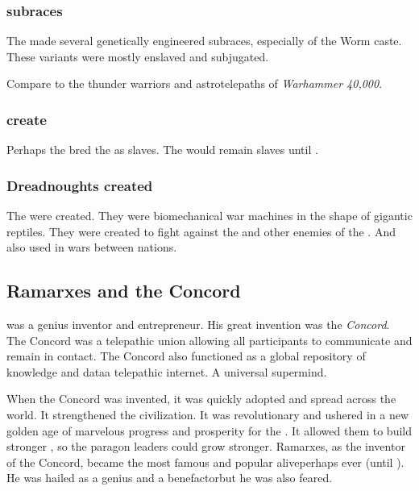 \subsubsection{\Ophidian subraces}
The \caisith made several genetically engineered subraces, especially of the Worm caste.
These \caisith variants were mostly enslaved and subjugated. 

Compare to the thunder warriors and astrotelepaths of \emph{Warhammer 40,000}. 





\subsubsection{\Ophidians create \nephilim}
Perhaps the \ophidians bred the \nephilim as slaves.
The \nephilim would remain slaves until . 





\subsubsection{Dreadnoughts created}
The  were created. 
They were biomechanical war machines in the shape of gigantic reptiles. 
They were created to fight against the \vorcanths and other enemies of the \ophidians.
And also used in wars between \ophidian nations. 















\subsection{Ramarxes and the Concord}
 was a genius \caisith inventor and entrepreneur. 
His great invention was the \emph{Concord}. 
The Concord was a telepathic union allowing all participants to communicate and remain in contact.
The Concord also functioned as a global repository of knowledge and data\dash a telepathic internet. 
A universal \caisith supermind. 

When the Concord was invented, it was quickly adopted and spread across the world. 
It strengthened the \caisith civilization.
It was revolutionary and ushered in a new golden age of marvelous progress and prosperity for the \caisith. 
It allowed them to build stronger \nexuses, so the paragon leaders could grow stronger. 
Ramarxes, as the inventor of the Concord, became the most famous and popular \caisith alive\dash perhaps ever (until \Sethicus). 
He was hailed as a genius and a benefactor\dash but he was also feared. 





